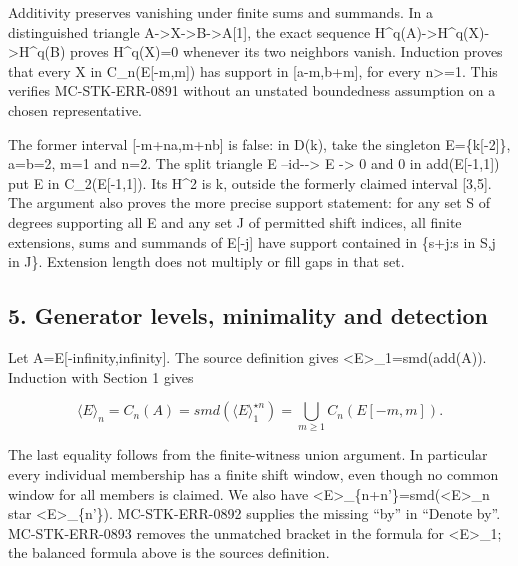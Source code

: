 Additivity preserves vanishing under finite sums and summands. In a distinguished triangle A\allowbreak{}->X\allowbreak{}->B\allowbreak{}->A[1]\allowbreak{},\allowbreak{} the exact sequence H\textasciicircum{}q(A)\allowbreak{}\allowbreak{}->H\textasciicircum{}q(X)\allowbreak{}\allowbreak{}->H\textasciicircum{}q(B)\allowbreak{} proves H\textasciicircum{}q(X)\allowbreak{}\allowbreak{}=0 whenever its two neighbors vanish. Induction proves that every X in C\_\allowbreak{}n(E[-m,\allowbreak{}m]\allowbreak{})\allowbreak{} has support in [a-m,\allowbreak{}b\allowbreak{}+m]\allowbreak{},\allowbreak{} for every n>\allowbreak{}=1. This verifies MC-STK-ERR-0891 without an unstated boundedness assumption on a chosen representative.

The former interval [-m\allowbreak{}+na,\allowbreak{}m\allowbreak{}+nb]\allowbreak{} is false:\allowbreak{} in D(k)\allowbreak{},\allowbreak{} take the singleton E\allowbreak{}=\{k[-2]\allowbreak{}\},\allowbreak{} a\allowbreak{}=b\allowbreak{}=2,\allowbreak{} m\allowbreak{}=1 and n\allowbreak{}=2. The split triangle E --id-\allowbreak{}-> E \allowbreak{}-> 0 and 0 in add(E[-1,\allowbreak{}1]\allowbreak{})\allowbreak{} put E in C\_\allowbreak{}2(E[-1,\allowbreak{}1]\allowbreak{})\allowbreak{}. Its H\^{}2 is k,\allowbreak{} outside the formerly claimed interval [3,\allowbreak{}5]\allowbreak{}. The argument also proves the more precise support statement:\allowbreak{} for any set S of degrees supporting all E and any set J of permitted shift indices,\allowbreak{} all finite extensions,\allowbreak{} sums and summands of E[-j]\allowbreak{} have support contained in \{s\allowbreak{}+j:\allowbreak{}s in S,\allowbreak{}j in J\}. Extension length does not multiply or fill gaps in that set.

\subsection{\texorpdfstring{5. Generator levels,\allowbreak{} minimality and detection}{5. Generator  minimality and detection}}\label{proofs-10691-11108-generator-levels-minimality-and-detection}

Let A\allowbreak{}=E[-infinity,\allowbreak{}infinity]\allowbreak{}. The source definition gives <E>\_\allowbreak{}1\allowbreak{}=smd(add(A)\allowbreak{})\allowbreak{}. Induction with Section 1 gives

\[
 \langle E\rangle_n=C_n(A)
 =smd(\langle E\rangle_1^{\star n})
 =\bigcup_{m\geq1}C_n(E[-m,m]).
\]

The last equality follows from the finite-witness union argument. In particular every individual membership has a finite shift window,\allowbreak{} even though no common window for all members is claimed. We also have <E>\_\allowbreak{}\{n\allowbreak{}+n'\}\allowbreak{}=smd(<E>\_\allowbreak{}n star <E>\_\allowbreak{}\{n'\})\allowbreak{}. MC-STK-ERR-0892 supplies the missing ``by'' in ``Denote by''. MC-STK-ERR-0893 removes the unmatched bracket in the formula for <E>\_\allowbreak{}1; the balanced formula above is the source\textquotesingle s definition.

